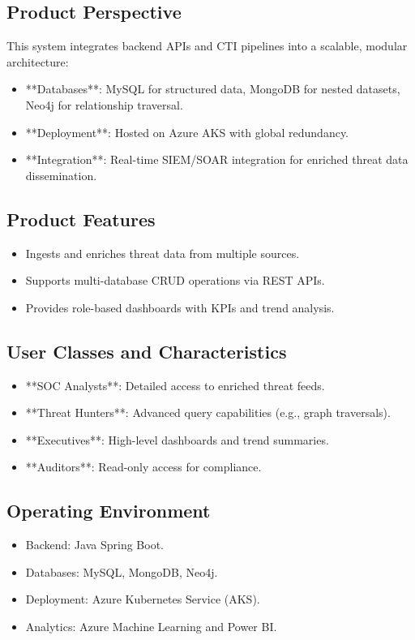 \documentclass[12pt]{article}
\begin{document}
\subsection{Product Perspective}
This system integrates backend APIs and CTI pipelines into a scalable, modular architecture:
\begin{itemize}
    \item **Databases**: MySQL for structured data, MongoDB for nested datasets, Neo4j for relationship traversal.
    \item **Deployment**: Hosted on Azure AKS with global redundancy.
    \item **Integration**: Real-time SIEM/SOAR integration for enriched threat data dissemination.
\end{itemize}

\subsection{Product Features}
\begin{itemize}
    \item Ingests and enriches threat data from multiple sources.
    \item Supports multi-database CRUD operations via REST APIs.
    \item Provides role-based dashboards with KPIs and trend analysis.
\end{itemize}

\subsection{User Classes and Characteristics}
\begin{itemize}
    \item **SOC Analysts**: Detailed access to enriched threat feeds.
    \item **Threat Hunters**: Advanced query capabilities (e.g., graph traversals).
    \item **Executives**: High-level dashboards and trend summaries.
    \item **Auditors**: Read-only access for compliance.
\end{itemize}

\subsection{Operating Environment}
\begin{itemize}
    \item Backend: Java Spring Boot.
    \item Databases: MySQL, MongoDB, Neo4j.
    \item Deployment: Azure Kubernetes Service (AKS).
    \item Analytics: Azure Machine Learning and Power BI.
\end{itemize}
\end{document}

